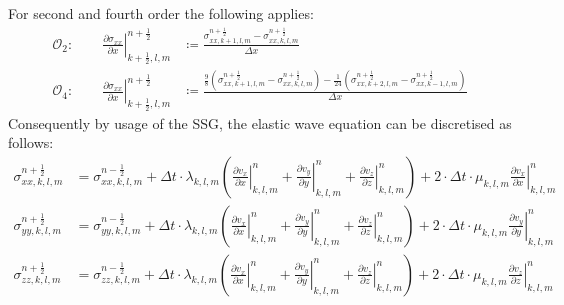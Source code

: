 \documentclass[pdftex,a4paper,parskip,listof=totoc,bibliography=totoc,onehalfspacing,12pt]{scrreprt}
\begin{document}
For second and fourth order the following applies: 
\begin{align}
	\mathcal{O}_2: \qquad   \left.\frac{\partial\sigma_{xx}}{\partial x}\right\rvert_{k+\frac{1}{2},l,m}^{n+\frac{1}{2}} &\overset{}{\coloneqq} \frac{\sigma_{xx,k+1,l,m}^{n+\frac{1}{2}} - \sigma_{xx,k,l,m}^{n+\frac{1}{2}}}{\Delta x}\label{eqn:FDO2O}\\
	\mathcal{O}_4: \qquad  \left.\frac{\partial\sigma_{xx}}{\partial x}\right\rvert_{k+\frac{1}{2},l,m}^{n+\frac{1}{2}} &\overset{}{\coloneqq} \frac{\frac{9}{8}\left(\sigma_{xx,k+1,l,m}^{n+\frac{1}{2}} - \sigma_{xx,k,l,m}^{n+\frac{1}{2}}\right) - \frac{1}{24}\left(\sigma_{xx,k+2,l,m}^{n+\frac{1}{2}} - \sigma_{xx,k-1,l,m}^{n+\frac{1}{2}}\right)}{\Delta x}
\end{align}
Consequently by usage of the SSG, the elastic wave equation can be discretised as follows:
\begin{align*}
	\sigma_{xx,k,l,m}^{n+\frac{1}{2}} &= \sigma_{xx,k,l,m}^{n-\frac{1}{2}} + \Delta t \cdot \lambda_{k,l,m} \left( \left.\frac{\partial v_x}{\partial x}\right\rvert_{k,l,m}^n + \left.\frac{\partial v_y}{\partial y}\right\rvert_{k,l,m}^n + \left.\frac{\partial v_z}{\partial z}\right\rvert_{k,l,m}^n \right) + 2 \cdot \Delta t  \cdot\mu_{k,l,m} \left.\frac{\partial v_x}{\partial x}\right\rvert_{k,l,m}^n\\
	\sigma_{yy,k,l,m}^{n+\frac{1}{2}} &= \sigma_{yy,k,l,m}^{n-\frac{1}{2}} + \Delta t \cdot \lambda_{k,l,m} \left( \left.\frac{\partial v_x}{\partial x}\right\rvert_{k,l,m}^n + \left.\frac{\partial v_y}{\partial y}\right\rvert_{k,l,m}^n + \left.\frac{\partial v_z}{\partial z}\right\rvert_{k,l,m}^n \right) + 2 \cdot \Delta t \cdot \mu_{k,l,m} \left.\frac{\partial v_y}{\partial y}\right\rvert_{k,l,m}^n\\
	\sigma_{zz,k,l,m}^{n+\frac{1}{2}} &= \sigma_{zz,k,l,m}^{n-\frac{1}{2}} + \Delta t \cdot \lambda_{k,l,m} \left( \left.\frac{\partial v_x}{\partial x}\right\rvert_{k,l,m}^n + \left.\frac{\partial v_y}{\partial y}\right\rvert_{k,l,m}^n + \left.\frac{\partial v_z}{\partial z}\right\rvert_{k,l,m}^n \right) + 2 \cdot \Delta t \cdot \mu_{k,l,m} \left.\frac{\partial v_z}{\partial z}\right\rvert_{k,l,m}^n
\end{align*}
\end{document}
